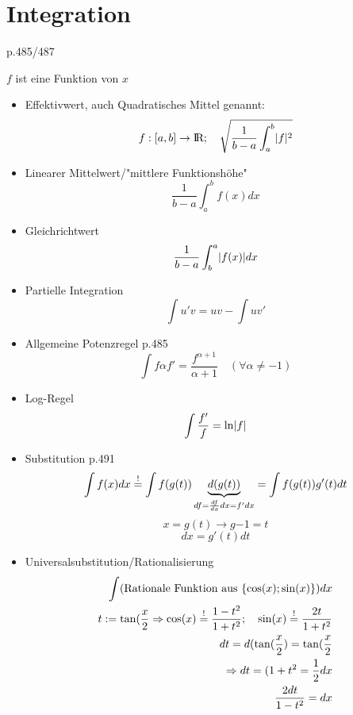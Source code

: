 \section{Integration}
	{\color{red}p.485/487}

$f$ ist eine Funktion von $x$
\begin{itemize}
	\item Effektivwert,
		auch Quadratisches Mittel genannt: 
	\[
		f:[a,b]\rightarrow\text{\rmfamily I\!R}; \quad \sqrt{\frac{1}{b-a}\int^b_a\lvert f\rvert^2}
	\]
	\item Linearer Mittelwert/"mittlere Funktionshöhe" 
	\[
		\frac{1}{b-a}\int^b_af(x)dx
	\] 
	\item Gleichrichtwert
	\[
		\frac{1}{b-a}\int^a_b\lvert f(x)\rvert dx
	\]
	\item Partielle Integration
	\[
		\int u'v = uv-\int uv'
	\]
	\item Allgemeine Potenzregel {\color{red}p.485}
	\[
		\int f\alpha f' = \frac{f^{\alpha+1}}{\alpha+1} \quad(\forall \alpha\neq-1)
	\]
	\item Log-Regel
	\[
		\int\frac{f'}{f}=\ln\lvert f\rvert
	\]
	\item Substitution  {\color{red}p.491}
	\[
		\int f(x)dx \stackrel{!}{=}\int f(g(t))\underbrace{d(g(t))}_{df = \frac{df}{dx}dx=f'dx}=\int f(g(t))g'(t)dt  \newline
	\]
	\[
		x=g(t) \rightarrow g{-1}=t\]
	\[
		dx = g'(t)dt
	\]
	\item Universalsubstitution/Rationalisierung
	\begin{align}
		\int (\text{Rationale Funktion aus }\{\cos(x);\sin(x)\})dx \\
		t:=\tan(\frac{x}{2} \Rightarrow \cos(x)\stackrel{!}{=}\frac{1-t^2}{1+t^2}; \quad\sin(x)\stackrel{!}{=}\frac{2t}{1+t^2} \\
		dt=d(\tan(\frac{x}{2})=\tan(\frac{x}{2}\nonumber \\
		\Rightarrow dt = (1+t^2=\frac{1}{2}dx\notag\\
		\frac{2dt}{1-t^2}=dx
	\end{align}
\end{itemize}	